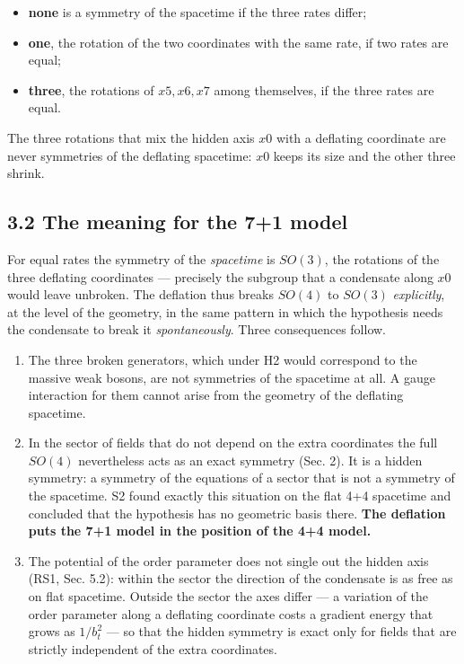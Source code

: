\documentclass[
  10pt,
]{article}
\providecommand{\tightlist}{%
  \setlength{\itemsep}{0pt}\setlength{\parskip}{0pt}}
\begin{document}
\begin{itemize}
\tightlist
\item
  \textbf{none} is a symmetry of the spacetime if the three rates
  differ;
\item
  \textbf{one}, the rotation of the two coordinates with the same rate,
  if two rates are equal;
\item
  \textbf{three}, the rotations of \(x5,x6,x7\) among themselves, if the
  three rates are equal.
\end{itemize}

The three rotations that mix the hidden axis \(x0\) with a deflating
coordinate are never symmetries of the deflating spacetime: \(x0\) keeps
its size and the other three shrink.

\hypertarget{the-meaning-for-the-71-model}{%
\subsection{3.2 The meaning for the 7+1
model}\label{the-meaning-for-the-71-model}}

For equal rates the symmetry of the \emph{spacetime} is \(SO(3)\), the
rotations of the three deflating coordinates --- precisely the subgroup
that a condensate along \(x0\) would leave unbroken. The deflation thus
breaks \(SO(4)\) to \(SO(3)\) \emph{explicitly}, at the level of the
geometry, in the same pattern in which the hypothesis needs the
condensate to break it \emph{spontaneously}. Three consequences follow.

\begin{enumerate}
\def\labelenumi{\arabic{enumi}.}
\tightlist
\item
  The three broken generators, which under H2 would correspond to the
  massive weak bosons, are not symmetries of the spacetime at all. A
  gauge interaction for them cannot arise from the geometry of the
  deflating spacetime.
\item
  In the sector of fields that do not depend on the extra coordinates
  the full \(SO(4)\) nevertheless acts as an exact symmetry (Sec. 2). It
  is a hidden symmetry: a symmetry of the equations of a sector that is
  not a symmetry of the spacetime. S2 found exactly this situation on
  the flat 4+4 spacetime and concluded that the hypothesis has no
  geometric basis there. \textbf{The deflation puts the 7+1 model in the
  position of the 4+4 model.}
\item
  The potential of the order parameter does not single out the hidden
  axis (RS1, Sec. 5.2): within the sector the direction of the
  condensate is as free as on flat spacetime. Outside the sector the
  axes differ --- a variation of the order parameter along a deflating
  coordinate costs a gradient energy that grows as \(1/b_t^2\) --- so
  that the hidden symmetry is exact only for fields that are strictly
  independent of the extra coordinates.
\end{enumerate}
\end{document}
